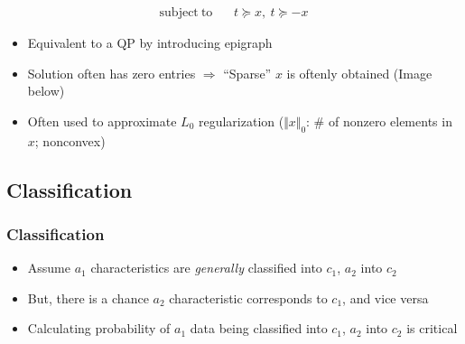 \begin{itemize}
$$\begin{aligned}
            \mathrm{subject~to}~~&~~t\succeq x,~t\succeq -x
        \end{aligned} $$
    \begin{itemize}
        \item Equivalent to a QP by introducing epigraph
        \item Solution often has zero entries $\Rightarrow$ ``Sparse'' $x$ is oftenly obtained (Image below)
        \item Often used to approximate $L_0$ regularization ($\Vert x\Vert_0$: \# of nonzero elements in $x$; nonconvex)
    \end{itemize}
    \begin{figures}
    \end{figures}
\end{itemize}

\subsection{Classification}

\subsubsection*{Classification}
\begin{itemize}
    \item Assume $a_1$ characteristics are \textit{generally} classified into $c_1$, $a_2$ into $c_2$
    \item But, there is a chance $a_2$ characteristic corresponds to $c_1$, and vice versa
    \item Calculating probability of $a_1$ data being classified into $c_1$, $a_2$ into $c_2$ is critical
\end{itemize}

